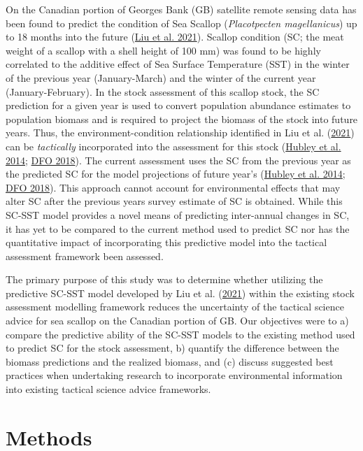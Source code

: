 \documentclass[
]{article}
\begin{document}
On the Canadian portion of Georges Bank (GB) satellite remote sensing data has been found to predict the condition of Sea Scallop (\emph{Placotpecten magellanicus}) up to 18 months into the future (\protect\hyperlink{ref-liuUsingSatelliteRemote2021}{Liu et al. 2021}). Scallop condition (SC; the meat weight of a scallop with a shell height of 100 mm) was found to be highly correlated to the additive effect of Sea Surface Temperature (SST) in the winter of the previous year (January-March) and the winter of the current year (January-February). In the stock assessment of this scallop stock, the SC prediction for a given year is used to convert population abundance estimates to population biomass and is required to project the biomass of the stock into future years. Thus, the environment-condition relationship identified in Liu et al. (\protect\hyperlink{ref-liuUsingSatelliteRemote2021}{2021}) can be \emph{tactically} incorporated into the assessment for this stock (\protect\hyperlink{ref-hubleyGeorgesBankBrowns2014}{Hubley et al. 2014}; \protect\hyperlink{ref-dfoStockStatusUpdate2018}{DFO 2018}). The current assessment uses the SC from the previous year as the predicted SC for the model projections of future year's (\protect\hyperlink{ref-hubleyGeorgesBankBrowns2014}{Hubley et al. 2014}; \protect\hyperlink{ref-dfoStockStatusUpdate2018}{DFO 2018}). This approach cannot account for environmental effects that may alter SC after the previous years survey estimate of SC is obtained. While this SC-SST model provides a novel means of predicting inter-annual changes in SC, it has yet to be compared to the current method used to predict SC nor has the quantitative impact of incorporating this predictive model into the tactical assessment framework been assessed.

The primary purpose of this study was to determine whether utilizing the predictive SC-SST model developed by Liu et al. (\protect\hyperlink{ref-liuUsingSatelliteRemote2021}{2021}) within the existing stock assessment modelling framework reduces the uncertainty of the tactical science advice for sea scallop on the Canadian portion of GB. Our objectives were to a) compare the predictive ability of the SC-SST models to the existing method used to predict SC for the stock assessment, b) quantify the difference between the biomass predictions and the realized biomass, and (c) discuss suggested best practices when undertaking research to incorporate environmental information into existing tactical science advice frameworks.

\hypertarget{ref-methods}{%
\section{Methods}\label{ref-methods}}
\end{document}
